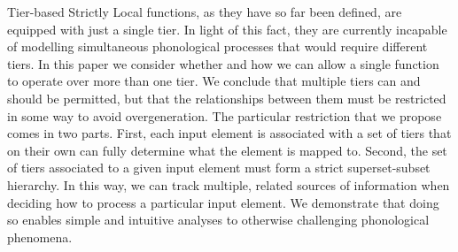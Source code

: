 Tier-based Strictly Local functions, as they have so far been defined, are equipped with just a single tier. In light of this fact, they are currently incapable of modelling simultaneous phonological processes that would require different tiers. In this paper we consider whether and how we can allow a single function to operate over more than one tier. We conclude that multiple tiers can and should be permitted, but that the relationships between them must be restricted in some way to avoid overgeneration. The particular restriction that we propose comes in two parts. First, each input element is associated with a set of tiers that on their own can fully determine what the element is mapped to. Second, the set of tiers associated to a given input element must form a strict superset-subset hierarchy. In this way, we can track multiple, related sources of information when deciding how to process a particular input element. We demonstrate that doing so enables simple and intuitive analyses to otherwise challenging phonological phenomena.
